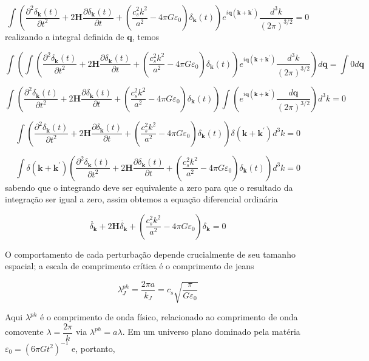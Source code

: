 \documentclass[a4paper,12pt]{article}
\begin{document}
$$\int \left(\dfrac{\partial^2\delta_\mathbf{k}(t)}{\partial t^2}+ 2\mathbf{H}\dfrac{\partial\delta_\mathbf{k}(t)}{\partial t} +( \dfrac{c^2_sk^2}{a^2} - 4\pi G\varepsilon_0)\delta_\mathbf{k}(t) \right) e^{i\mathbf{q}(\mathbf{k}+\mathbf{k}^\prime)}\dfrac{d^3k}{(2\pi)^{3/2}} =0 $$
realizando a integral definida de $\mathbf{q}$, temos

$$\int\left( \int \left(\dfrac{\partial^2\delta_\mathbf{k}(t)}{\partial t^2}+ 2\mathbf{H}\dfrac{\partial\delta_\mathbf{k}(t)}{\partial t} +( \dfrac{c^2_sk^2}{a^2} - 4\pi G\varepsilon_0)\delta_\mathbf{k}(t) \right) e^{i\mathbf{q}(\mathbf{k}+\mathbf{k}^\prime)}\dfrac{d^3k}{(2\pi)^{3/2}} \right)d\mathbf{q} =\int0d\mathbf{q} $$

$$ \int \left(\dfrac{\partial^2\delta_\mathbf{k}(t)}{\partial t^2}+ 2\mathbf{H}\dfrac{\partial\delta_\mathbf{k}(t)}{\partial t} +( \dfrac{c^2_sk^2}{a^2} - 4\pi G\varepsilon_0)\delta_\mathbf{k}(t) \right) \int\left(e^{i\mathbf{q}(\mathbf{k}+\mathbf{k}^\prime)}\dfrac{d\mathbf{q}}{(2\pi)^{3/2}} \right)d^3k =0 $$

$$ \int \left(\dfrac{\partial^2\delta_\mathbf{k}(t)}{\partial t^2}+ 2\mathbf{H}\dfrac{\partial\delta_\mathbf{k}(t)}{\partial t} +( \dfrac{c^2_sk^2}{a^2} - 4\pi G\varepsilon_0)\delta_\mathbf{k}(t) \right) \delta(\mathbf{k}+\mathbf{k}^\prime)d^3k =0 $$

$$\int\delta(\mathbf{k}+\mathbf{k}^\prime)\left(\dfrac{\partial^2\delta_\mathbf{k}(t)}{\partial t^2}+ 2\mathbf{H}\dfrac{\partial\delta_\mathbf{k}(t)}{\partial t} +( \dfrac{c^2_sk^2}{a^2} - 4\pi G\varepsilon_0)\delta_\mathbf{k}(t) \right) d^3k =0 $$
sabendo que o integrando deve ser equivalente a zero para que o resultado da integração ser igual a zero, assim obtemos a equação diferencial ordinária
 
\begin{equation}
	\ddot{\delta_\mathbf{k}} + 2\mathbf{H}\dot{\delta_\mathbf{k}} + \left( \dfrac{c^2_s k^2}{a^2} -4\pi G\varepsilon_0\right)\delta_\mathbf{k} = 0
\end{equation}

O comportamento de cada perturbação depende crucialmente de seu tamanho espacial; a escala de comprimento crítica é o comprimento de jeans

\begin{equation}
	\lambda^{ph}_J = \dfrac{2\pi a }{k_J} = c_s\sqrt{\dfrac{\pi}{G\varepsilon_0}}
\end{equation}

Aqui $\lambda^{ph}$ é o comprimento de onda físico, relacionado
ao comprimento de onda comovente $\lambda = \dfrac{2\pi}{k}$ via $\lambda^{ph} = a\lambda$. Em um universo plano dominado pela matéria $\varepsilon_0 = (6\pi G t^2)^{-1}$ e, portanto,
\end{document}
